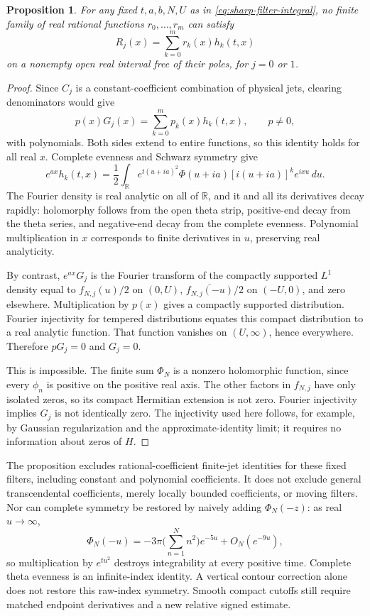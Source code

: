 \documentclass[11pt]{article}
\numberwithin{equation}{section}
\newtheorem{proposition}[theorem]{Proposition}
\theoremstyle{definition}
\theoremstyle{remark}
\newcommand{\R}{\mathbb R}
\newcommand{\dd}{\,d}
\begin{document}
\begin{proposition}\label{prop:no-rational-filter-closure}
For any fixed $t,a,b,N,U$ as in
\eqref{eq:sharp-filter-integral}, no finite family of real rational
functions $r_0,\ldots,r_m$ can satisfy
\begin{equation}
 R_j(x)=\sum_{k=0}^m r_k(x)h_k(t,x)
 \label{eq:forbidden-rational-closure}
\end{equation}
on a nonempty open real interval free of their poles, for $j=0$ or $1$.
\end{proposition}
\begin{proof}
Since $C_j$ is a constant-coefficient combination of physical jets,
clearing denominators would give
\[
 p(x)G_j(x)=\sum_{k=0}^m p_k(x)h_k(t,x),\qquad p\ne0,
\]
with polynomials. Both sides extend to entire functions, so this
identity holds for all real $x$.
Complete evenness and Schwarz symmetry give
\begin{equation}
 e^{ax}h_k(t,x)=\frac12\int_{\R}
 e^{t(u+ia)^2}\Phi(u+ia)[i(u+ia)]^k e^{ixu}\dd u.
 \label{eq:whole-line-filter-closure}
\end{equation}
The Fourier density is real analytic on all of $\R$, and it and all its
derivatives decay rapidly: holomorphy follows from the open theta strip,
positive-end decay from the theta series, and negative-end decay from
the complete evenness. Polynomial multiplication in $x$ corresponds
to finite derivatives in $u$, preserving real analyticity.

By contrast, $e^{ax}G_j$ is the Fourier transform of the compactly
supported $L^1$ density equal to $f_{N,j}(u)/2$ on $(0,U)$,
$\overline{f_{N,j}(-u)}/2$ on $(-U,0)$, and zero elsewhere.
Multiplication by $p(x)$ gives a compactly supported distribution.
Fourier injectivity for tempered distributions equates this compact
distribution to a real analytic function. That function vanishes on
$(U,\infty)$, hence everywhere. Therefore $pG_j=0$ and $G_j=0$.

This is impossible. The finite sum $\Phi_N$ is a nonzero holomorphic
function, since every $\phi_n$ is positive on the positive real axis.
The other factors in $f_{N,j}$ have only isolated zeros, so its compact
Hermitian extension is not zero. Fourier injectivity implies $G_j$ is
not identically zero. The injectivity used here follows, for example,
by Gaussian regularization and the approximate-identity limit; it
requires no information about zeros of $H$.
\end{proof}

The proposition excludes rational-coefficient finite-jet identities for
these fixed filters, including constant and polynomial coefficients.
It does not exclude general transcendental coefficients, merely locally
bounded coefficients, or moving filters. Nor can complete symmetry be
restored by naively adding $\Phi_N(-z)$: as real $u\to\infty$,
\[
 \Phi_N(-u)=-3\pi\Big(\sum_{n=1}^Nn^2\Big)e^{-5u}+O_N(e^{-9u}),
\]
so multiplication by $e^{tu^2}$ destroys integrability at every
positive time. Complete theta evenness is an infinite-index identity.
A vertical contour correction alone does not restore this raw-index
symmetry. Smooth compact cutoffs still require matched endpoint
derivatives and a new relative signed estimate.
\end{document}
